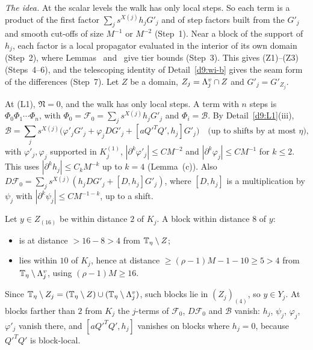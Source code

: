 \begin{detail}\label{d9:lift}
\emph{The idea.} At the scalar levels the walk has only local steps. So each term is a product of the first factor $\sum_js^{X(j)}h_jG'_j$ and of step factors built from the $G'_j$ and smooth cut-offs of size $M^{-1}$ or $M^{-2}$ (Step~1). Near a block of the support of $h_j$, each factor is a local propagator evaluated in the interior of its own domain (Step~2), where Lemmas~ and~ give tier bounds (Step~3). This gives (Z1)--(Z3) (Steps~4--6), and the telescoping identity of Detail~\ref{d9:wi-b} gives the seam form of the differences (Step~7).
Let $Z$ be a domain, $Z_j=\Lambda^v_j\cap Z$ and $G'_j=G'_{Z_j}$.
\begin{step}
At (L1), $\mathfrak N=0$, and the walk has only local steps. A term with $n$ steps is $\Phi_0\Phi_1\cdots\Phi_n$, with $\Phi_0=\mathcal F_0=\sum_js^{X(j)}h_jG'_j$ and $\Phi_i=\mathcal B$. By Detail~\ref{d9:L1}(iii),
\[
\mathcal B=\sum_js^{X(j)}\big(\varphi'_jG'_j+\varphi_jDG'_j+[aQ'^TQ',h_j]G'_j\big)\quad\text{(up to shifts by at most $\eta$)},
\]
with $\varphi'_j,\varphi_j$ supported in $K_j^{(1)}$, $|\partial^k\varphi'_j|\le CM^{-2}$ and $|\partial^k\varphi_j|\le CM^{-1}$ for $k\le2$. This uses $|\partial^kh_j|\le C_kM^{-k}$ up to $k=4$ (Lemma~(c)). Also $D\mathcal F_0=\sum_js^{X(j)}(h_jDG'_j+[D,h_j]G'_j)$, where $[D,h_j]$ is a multiplication by $\psi_j$ with $|\partial^k\psi_j|\le CM^{-1-k}$, up to a shift.
\end{step}
\begin{step}
Let $y\in Z_{(16)}$ be within distance $2$ of $K_j$. A block within distance $8$ of $y$:
\begin{itemize}
\item is at distance $>16-8>4$ from $\mathbb T_\eta\setminus Z$;
\item lies within $10$ of $K_j$, hence at distance $\ge(\rho-1)M-1-10\ge5>4$ from $\mathbb T_\eta\setminus\Lambda^v_j$, using $(\rho-1)M\ge16$.
\end{itemize}
Since $\mathbb T_\eta\setminus Z_j=(\mathbb T_\eta\setminus Z)\cup(\mathbb T_\eta\setminus\Lambda^v_j)$, such blocks lie in $(Z_j)_{(4)}$, so $y\in Y_j$. At blocks farther than $2$ from $K_j$ the $j$-terms of $\mathcal F_0$, $D\mathcal F_0$ and $\mathcal B$ vanish: $h_j$, $\psi_j$, $\varphi_j$, $\varphi'_j$ vanish there, and $[aQ'^TQ',h_j]$ vanishes on blocks where $h_j=0$, because $Q'^TQ'$ is block-local.
\end{step}
\begin{step}

\end{step}
\end{detail}
